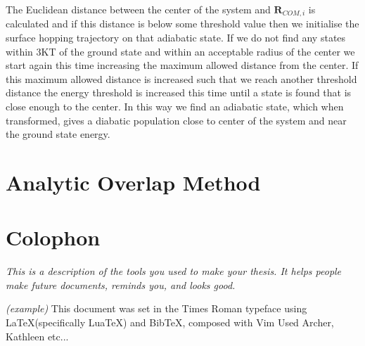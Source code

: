 The Euclidean distance between the center of the system and $\mathbf{R}_{COM, i}$ is calculated and if this distance is below some threshold value then we initialise the surface hopping trajectory on that adiabatic state. If we do not find any states within 3KT of the ground state and within an acceptable radius of the center we start again this time increasing the maximum allowed distance from the center. If this maximum allowed distance is increased such that we reach another threshold distance the energy threshold is increased this time until a state is found that is close enough to the center. In this way we find an adiabatic state, which when transformed, gives a diabatic population close to center of the system and near the ground state energy.



\chapter{Analytic Overlap Method}

\chapter{Colophon}
\label{appendixlabel3}
\textit{This is a description of the tools you used to make your thesis. It helps people make future documents, reminds you, and looks good.}

\textit{(example)} This document was set in the Times Roman typeface using \LaTeX (specifically LuaTeX) and Bib\TeX , composed with Vim 
Used Archer, Kathleen etc...

